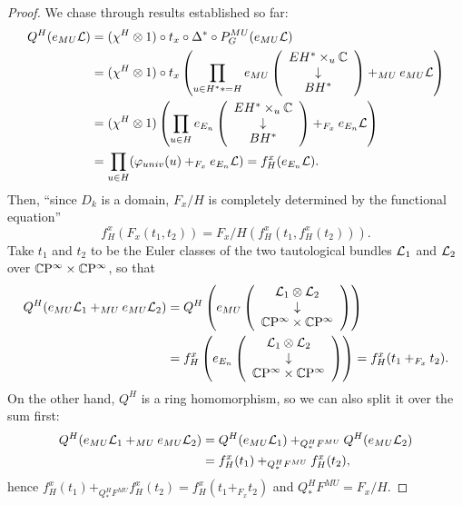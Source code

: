 \begin{proof}
We chase through results established so far:
\begin{align*}
Q^H(e_{MU} \mathcal{L}) & = (\chi^H \otimes 1) \circ t_x \circ \Delta^* \circ P^{MU}_G (e_{MU} \mathcal{L}) \\
& = (\chi^H \otimes 1) \circ t_x \left( \prod_{u \in H^** = H} e_{MU} \left( \begin{array}{c} EH^* \times_u \mathbb{C} \\ \downarrow \\ BH^* \end{array} \right) +_{MU} e_{MU} \mathcal{L} \right) \\
& = (\chi^H \otimes 1) \left( \prod_{u \in H} e_{E_n} \left( \begin{array}{c} EH^* \times_u \mathbb{C} \\ \downarrow \\ BH^* \end{array} \right) +_{F_x} e_{E_n} \mathcal{L} \right) \\
& = \prod_{u \in H} (\varphi_{univ}(u) +_{F_x} e_{E_n} \mathcal{L}) = f_H^x(e_{E_n} \mathcal{L}).
\end{align*}
Then, ``since $D_k$ is a domain, $F_x/H$ is completely determined by the functional equation'' \[f_H^x(F_x(t_1, t_2)) = F_x/H(f_H^x(t_1, f_H^x(t_2))).\]  Take $t_1$ and $t_2$ to be the Euler classes of the two tautological bundles $\mathcal{L}_1$ and $\mathcal{L}_2$ over $\mathbb{C}\mathrm P^\infty \times \mathbb{C}\mathrm P^\infty$, so that
\begin{align*}
Q^H(e_{MU} \mathcal{L}_1 +_{MU} e_{MU} \mathcal{L}_2) & = Q^H\left(e_{MU} \left( \begin{array}{c} \mathcal{L}_1 \otimes \mathcal{L}_2 \\ \downarrow \\ \mathbb{C}\mathrm P^\infty \times \mathbb{C}\mathrm P^\infty \end{array} \right)\right) \\
& = f_H^x \left(e_{E_n} \left( \begin{array}{c} \mathcal{L}_1 \otimes \mathcal{L}_2 \\ \downarrow \\ \mathbb{C}\mathrm P^\infty \times \mathbb{C}\mathrm P^\infty \end{array} \right)\right) = f_H^x(t_1 +_{F_x} t_2).
\end{align*}
On the other hand, $Q^H$ is a ring homomorphism, so we can also split it over the sum first:
\begin{align*}
Q^H(e_{MU} \mathcal{L}_1 +_{MU} e_{MU} \mathcal{L}_2) & = Q^H(e_{MU} \mathcal{L}_1) +_{Q^H_* F^{MU}} Q^H(e_{MU} \mathcal{L}_2) \\
& = f_H^x(t_1) +_{Q^H_* F^{MU}} f_H^x(t_2),
\end{align*}
hence $f_H^x(t_1) +_{Q^H_* F^{MU}} f_H^x(t_2) = f_H^x(t_1 +_{F_x} t_2)$ and $Q^H_* F^{MU} = F_x / H$.
\end{proof}

